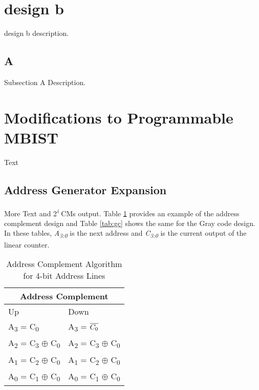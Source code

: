 \section{design b}
\label{sect:design-b}
design b description.   

\subsection{A}
Subsection A Description.  

\section{Modifications to Programmable MBIST}
\label{sect:bg-modifications}
Text

\subsection{Address Generator Expansion}
More Text and 2\textsuperscript{\textit{i}} CMs output.  Table \ref{tab:ac}
provides an example of the address complement design and Table \ref{tab:gc} shows the same for the Gray code design.  In these tables, \textit{A\textsubscript{3:0}} is the next address and \textit{C\textsubscript{3:0}} is the current output of the linear counter.

\begin{table}[H]
  \centering
  \caption[Address Complement CM Algorithm]{Address Complement Algorithm for 4-bit Address Lines}
  \begin{tabular}{|l|l|}
    \hline
    \multicolumn{2}{|c|}{Address Complement} \\
    \hline  
    Up  & Down  \\                                                          
    \hline
    A\textsubscript{3} = C\textsubscript{0}                           & A\textsubscript{3} = $\overline{C\textsubscript{0}}$              \\ %
    A\textsubscript{2} = C\textsubscript{3} $\oplus$ C\textsubscript{0} & A\textsubscript{2} = C\textsubscript{3} $\oplus$ C\textsubscript{0} \\ %
    A\textsubscript{1} = C\textsubscript{2} $\oplus$ C\textsubscript{0} & A\textsubscript{1} = C\textsubscript{2} $\oplus$ C\textsubscript{0} \\ %
    A\textsubscript{0} = C\textsubscript{1} $\oplus$ C\textsubscript{0} & A\textsubscript{0} = C\textsubscript{1} $\oplus$ C\textsubscript{0} \\ %
    \hline
  \end{tabular} 
  \label{tab:ac}
\end{table}

